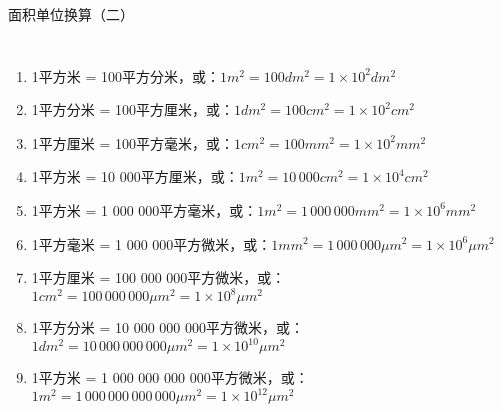 \documentclass[aspectratio=169]{ctexbeamer} %
\begin{document}
\begin{frame}[t]{面积单位换算（二）}
\begin{columns}
\begin{enumerate}[label={\Alph*.}]
\item 1平方米 = 100平方分米，或：$1m^2 = 100 dm^2 = 1 \times 10^2 dm^2$ \pause
\item 1平方分米 = 100平方厘米，或：$1dm^2 = 100 cm^2 = 1 \times 10^2 cm^2$ \pause
\item 1平方厘米 = 100平方毫米，或：$1cm^2 = 100 mm^2 = 1 \times 10^2 mm^2$ \pause
\item 1平方米 = 10 000平方厘米，或：$1m^2 = 10\,000 cm^2 = 1 \times 10^4 cm^2$ \pause
\item 1平方米 = 1 000 000平方毫米，或：$1m^2 = 1 \, 000 \, 000 mm^2 = 1 \times 10^6 mm^2$ \pause
\item 1平方毫米 = 1 000 000平方微米，或：$1mm^2 = 1 \, 000 \, 000 \mu m^2 = 1 \times 10^6  \mu m^2$ \pause
\item 1平方厘米 = 100 000 000平方微米，或：$1cm^2 = 100 \, 000 \, 000  \mu m^2 = 1 \times 10^8  \mu m^2$ \pause
\item 1平方分米 = 10 000 000 000平方微米，或：$1dm^2 = 10 \, 000 \, 000 \, 000  \mu m^2 = 1 \times 10^{10}  \mu m^2$ \pause
\item 1平方米 = 1 000 000 000 000平方微米，或：$1m^2 = 1 \, 000 \, 000 \, 000 \, 000 \mu m^2 = 1 \times 10^{12}  \mu m^2$ \pause
\end{enumerate}
\end{columns}
\end{frame}
\end{document}
